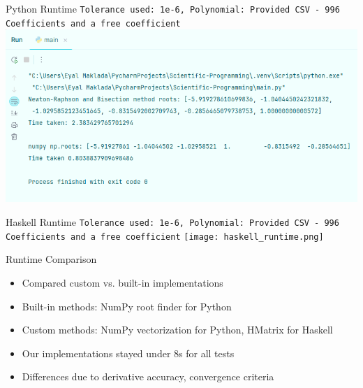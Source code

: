 \documentclass{beamer}
\begin{document}
\begin{frame}[fragile]{Python Runtime}
\texttt{Tolerance used: 1e-6, Polynomial: Provided CSV - 996 Coefficients and a free coefficient}
\includegraphics[width=1.0\textwidth]{python_runtime.png}
\end{frame}

\begin{frame}[fragile]{Haskell Runtime}
\texttt{Tolerance used: 1e-6, Polynomial: Provided CSV - 996 Coefficients and a free coefficient}
\texttt{[image: haskell\_runtime.png]}
\end{frame}

\begin{frame}{Runtime Comparison}
\begin{itemize}
    \item Compared custom vs. built-in implementations
    \item Built-in methods: NumPy root finder for Python
    \item Custom methods: NumPy vectorization for Python, HMatrix for Haskell
    \item Our implementations stayed under 8s for all tests
    \item Differences due to derivative accuracy, convergence criteria
\end{itemize}
\end{frame}
\end{document}
